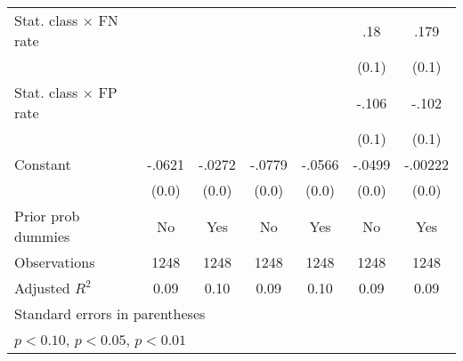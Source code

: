 \begin{table}[htbp]
\begin{tabular}{l*{6}{c}}
Stat. class $\times$ FN rate&                  &                  &                  &                  &      .18\sym{*}  &     .179\sym{*}  \\
                &                  &                  &                  &                  &    (0.1)         &    (0.1)         \\
Stat. class $\times$ FP rate&                  &                  &                  &                  &    -.106         &    -.102         \\
                &                  &                  &                  &                  &    (0.1)         &    (0.1)         \\
Constant        &   -.0621\sym{***}&   -.0272         &   -.0779\sym{***}&   -.0566         &   -.0499\sym{**} &  -.00222         \\
                &    (0.0)         &    (0.0)         &    (0.0)         &    (0.0)         &    (0.0)         &    (0.0)         \\
Prior prob dummies &       No         &      Yes         &       No         &      Yes         &       No         &      Yes         \\
\hline
Observations    &     1248         &     1248         &     1248         &     1248         &     1248         &     1248         \\
Adjusted \(R^{2}\)&     0.09         &     0.10         &     0.09         &     0.10         &     0.09         &     0.09         \\
\hline\hline
\multicolumn{7}{l}{\footnotesize Standard errors in parentheses}\\
\multicolumn{7}{l}{\footnotesize \sym{*} \(p<0.10\), \sym{**} \(p<0.05\), \sym{***} \(p<0.01\)}\\
\end{tabular}
\end{table}
